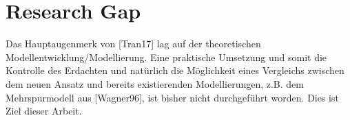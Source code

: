 \section{Research Gap}
\label{sec:researchgap}

Das Hauptaugenmerk von [Tran17] lag auf der theoretischen Modellentwicklung/Modellierung. Eine praktische Umsetzung und somit die Kontrolle des Erdachten und natürlich die Möglichkeit eines Vergleichs zwischen dem neuen Ansatz und bereits existierenden Modellierungen, z.B. dem Mehrspurmodell aus [Wagner96], ist bisher nicht durchgeführt worden. Dies ist Ziel dieser Arbeit.
